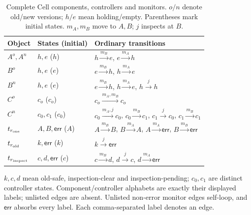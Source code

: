 \begin{table}[!htbp]
\caption{Complete Cell components, controllers and monitors. $o/n$ denote old/new versions; $h/e$ mean holding/empty. Parentheses mark initial states. $m_A,m_B$ move to $A,B$; $j$ inspects at $B$.}
\label{tab:cell-finite-main}
\centering\small
\begin{tabular}{@{}>{\raggedright\arraybackslash}p{.16\linewidth}>{\raggedright\arraybackslash}p{.20\linewidth}p{.58\linewidth}@{}}\toprule
Object & States (initial) & Ordinary transitions\\\midrule
$A^o,A^n$ & $h,e$ ($h$) & $h\xrightarrow{m_B}e$, $e\xrightarrow{m_A}h$\\
$B^o$ & $h,e$ ($e$) & $e\xrightarrow{m_B}h$, $h\xrightarrow{m_A}e$\\
$B^n$ & $h,e$ ($e$) & $e\xrightarrow{m_B}h$, $h\xrightarrow{m_A}e$, $h\xrightarrow{j}h$\\
$C^o$ & $c_o$ ($c_o$) & $c_o\xrightarrow{m_A,m_B}c_o$\\
$C^n$ & $c_0,c_1$ ($c_0$) & $c_0\xrightarrow{m_A,j}c_0$, $c_0\xrightarrow{m_B}c_1$, $c_1\xrightarrow{j}c_0$, $c_1\xrightarrow{m_B}c_1$\\\midrule
$t_{r_{\rm one}}$ & $A,B,\mathsf{err}$ ($A$) & $A\xrightarrow{m_B}B$, $B\xrightarrow{m_A}A$, $A\xrightarrow{m_A}\mathsf{err}$, $B\xrightarrow{m_B}\mathsf{err}$\\
$t_{r_{\rm old}}$ & $k,\mathsf{err}$ ($k$) & $k\xrightarrow{j}\mathsf{err}$\\
$t_{r_{\rm inspect}}$ & $c,d,\mathsf{err}$ ($c$) & $c\xrightarrow{m_B}d$, $d\xrightarrow{j}c$, $d\xrightarrow{m_A}\mathsf{err}$\\\bottomrule
\end{tabular}
\par\smallskip\raggedright
$k,c,d$ mean old-safe, inspection-clear and inspection-pending; $c_0,c_1$ are distinct controller states.
Component/controller alphabets are exactly their displayed labels; unlisted edges are absent.
Unlisted non-error monitor edges self-loop, and $\mathsf{err}$ absorbs every label.
Each comma-separated label denotes an edge.\par
\end{table}
